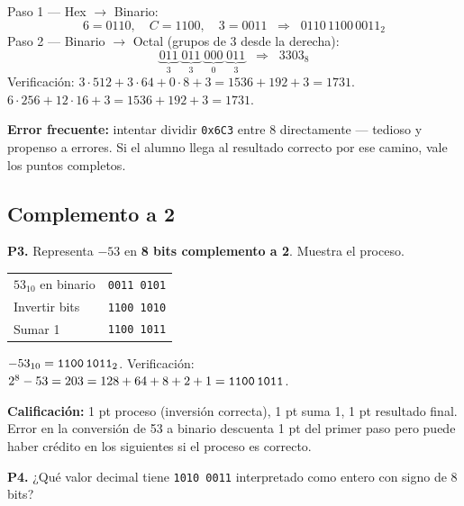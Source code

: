\documentclass[12pt, oneside]{article}
\begin{document}
\begin{notaprofesor}
  Paso 1 — Hex $\to$ Binario:
  \[
    6 = 0110, \quad C = 1100, \quad 3 = 0011
    \;\;\Rightarrow\;\; 0110\,1100\,0011_2
  \]
  Paso 2 — Binario $\to$ Octal (grupos de 3 desde la derecha):
  \[
    \underbrace{011}_{3}\;
    \underbrace{011}_{3}\;
    \underbrace{000}_{0}\;
    \underbrace{011}_{3}
    \;\;\Rightarrow\;\; 3303_8
  \]
  Verificación: $3\cdot512 + 3\cdot64 + 0\cdot8 + 3 = 1536+192+3 = 1731$.
  $6\cdot256 + 12\cdot16 + 3 = 1536+192+3 = 1731$.\ \checkmark

  \textbf{Error frecuente:} intentar dividir \texttt{0x6C3} entre 8
  directamente — tedioso y propenso a errores.  Si el alumno llega al
  resultado correcto por ese camino, vale los puntos completos.
\end{notaprofesor}

\subsection{Complemento a 2}

\textbf{P3.} Representa $-53$ en \textbf{8 bits complemento a 2}.
Muestra el proceso.

\begin{notaprofesor}
  \begin{center}
  \begin{tabular}{ll}
    $53_{10}$ en binario  & \texttt{0011 0101} \\
    Invertir bits          & \texttt{1100 1010} \\
    Sumar 1                & \texttt{1100 1011} \\
  \end{tabular}
  \end{center}
  $-53_{10} = \texttt{1100\,1011}_2$.
  Verificación: $2^8 - 53 = 203 = 128+64+8+2+1 = \texttt{1100\,1011}$. \checkmark

  \textbf{Calificación:} 1 pt proceso (inversión correcta), 1 pt suma 1,
  1 pt resultado final.  Error en la conversión de 53 a binario descuenta 1 pt
  del primer paso pero puede haber crédito en los siguientes si el proceso
  es correcto.
\end{notaprofesor}

\medskip
\textbf{P4.} ¿Qué valor decimal tiene \texttt{1010\,0011} interpretado
como entero con signo de 8 bits?
\end{document}
